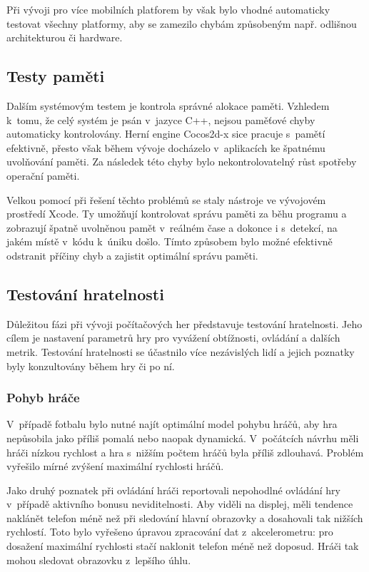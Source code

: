 \documentclass[thesis=B,czech,hidelinks]{FITthesis}[2012/06/26] %
\begin{document}
Při vývoji pro více mobilních platforem by však bylo vhodné automaticky testovat všechny platformy, aby se zamezilo chybám způsobeným např. odlišnou architekturou či hardware.

\subsection{Testy paměti}

Dalším systémovým testem je kontrola správné alokace paměti. Vzhledem k~tomu, že celý systém je psán v~jazyce C++, nejsou paměťové chyby automaticky kontrolovány. Herní engine Cocos2d-x sice pracuje s~pamětí efektivně, přesto však během vývoje docházelo v~aplikacích ke špatnému uvolňování paměti. Za následek této chyby bylo nekontrolovatelný růst spotřeby operační paměti.

Velkou pomocí při řešení těchto problémů se staly nástroje ve vývojovém prostředí Xcode. Ty umožňují kontrolovat správu paměti za běhu programu a zobrazují špatně uvolněnou pamět v~reálném čase a dokonce i s~detekcí, na jakém místě v~kódu k~úniku došlo. Tímto způsobem bylo možné efektivně odstranit příčiny chyb a zajistit optimální správu paměti.

\subsection{Testování hratelnosti}

Důležitou fázi při vývoji počítačových her představuje testování hratelnosti. Jeho cílem je nastavení parametrů hry pro vyvážení obtížnosti, ovládání a dalších metrik. Testování hratelnosti se účastnilo více nezávislých lidí a jejich poznatky byly konzultovány během hry či po ní.

\subsubsection{Pohyb hráče}

V~případě fotbalu bylo nutné najít optimální model pohybu hráčů, aby hra nepůsobila jako příliš pomalá nebo naopak dynamická. V~počátcích návrhu měli hráči nízkou rychlost a hra s~nižším počtem hráčů byla příliš zdlouhavá. Problém vyřešilo mírné zvýšení maximální rychlosti  hráčů.

Jako druhý poznatek při ovládání hráči reportovali nepohodlné ovládání hry v~případě aktivního bonusu neviditelnosti. Aby viděli na displej, měli tendence naklánět telefon méně než při sledování hlavní obrazovky a dosahovali tak nižších rychlostí. Toto bylo vyřešeno úpravou zpracování dat z~akcelerometru: pro dosažení maximální rychlosti stačí naklonit telefon méně než doposud. Hráči tak mohou sledovat obrazovku z~lepšího úhlu.
\end{document}
